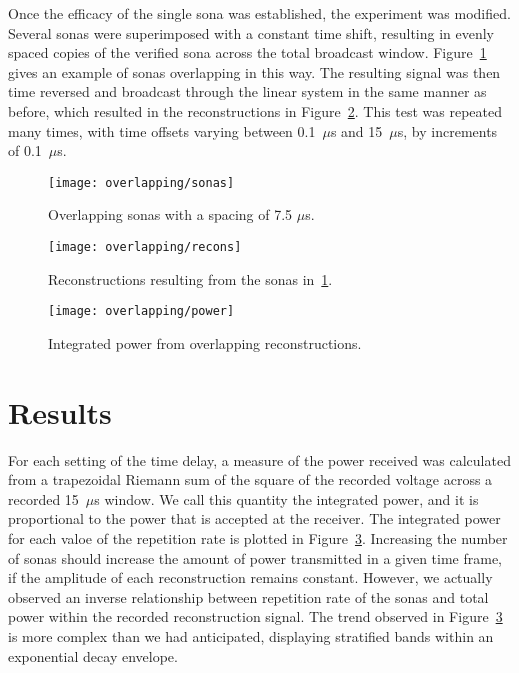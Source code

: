 Once the efficacy of the single sona was established, the experiment was modified. Several sonas were superimposed with a constant time shift, resulting in evenly spaced copies of the verified sona across the total broadcast window. Figure~\ref{fig:overlapping-sonas} gives an example of sonas overlapping in this way. The resulting signal was then time reversed and broadcast through the linear system in the same manner as before, which resulted in the reconstructions in Figure~\ref{fig:overlapping-recons}. This test was repeated many times, with time offsets varying between 0.1~$\mu$s and 15~$\mu$s, by increments of 0.1~$\mu$s.

\begin{figure}[t]
\centering
\texttt{[image: overlapping/sonas]}
\caption[Overlapping sonas]{Overlapping sonas with a spacing of 7.5 $\mu$s.}
\label{fig:overlapping-sonas}
\end{figure}

\begin{figure}[t]
\centering
\texttt{[image: overlapping/recons]}
\caption[Overlapping reconstructions]{Reconstructions resulting from the sonas in~\ref{fig:overlapping-sonas}.}
\label{fig:overlapping-recons}
\end{figure}

\begin{figure}[t]
\centering
\texttt{[image: overlapping/power]}
\caption[Power from overlapping reconstructions]{Integrated power from overlapping reconstructions.}
\label{fig:overlapping-power}
\end{figure}

\section{Results}
\label{sec:overlapping-results}

For each setting of the time delay, a measure of the power received was calculated from a trapezoidal Riemann sum of the square of the recorded voltage across a recorded 15~$\mu$s window. We call this quantity the integrated power, and it is proportional to the power that is accepted at the receiver. The integrated power for each valoe of the repetition rate is plotted in Figure~\ref{fig:overlapping-power}. Increasing the number of sonas should increase the amount of power transmitted in a given time frame, if the amplitude of each reconstruction remains constant. However, we actually observed an inverse relationship between repetition rate of the sonas and total power within the recorded reconstruction signal. The trend observed in Figure~\ref{fig:overlapping-power} is more complex than we had anticipated, displaying stratified bands within an exponential decay envelope. 



